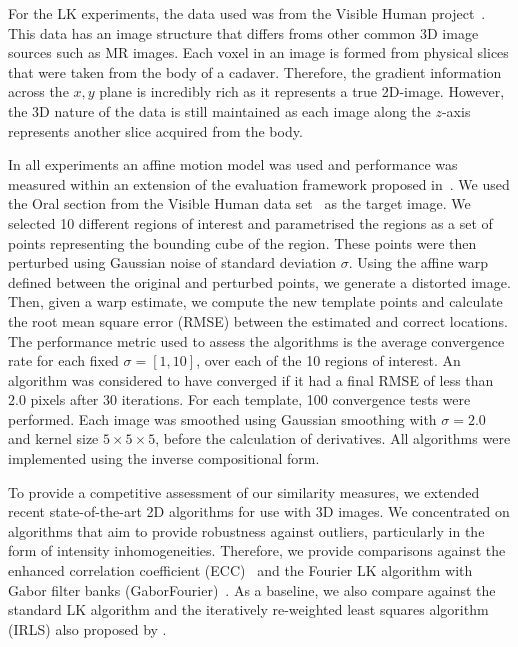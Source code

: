 For the LK experiments, the data used was from the Visible Human
project~\cite{spitzer1996visiblehuman}. 
This data has an image structure that differs froms
other common 3D image sources such as MR images. Each voxel in an image is
formed from physical slices that were taken from the body of a cadaver.
Therefore, the gradient information across the $x, y$ plane is incredibly rich
as it represents a true 2D-image. However, the 3D nature of the data is still
maintained as each image along the $z$-axis represents another slice acquired
from the body.

In all experiments an affine motion model was used and performance was measured
within an extension of the evaluation framework proposed 
in~\cite{tzimiropoulos2011robust}.
We used the Oral section from the Visible Human data 
set~\cite{spitzer1996visiblehuman} as
the target image. We selected 10 different regions of interest and parametrised
the regions as a set of points representing the bounding cube of the region.
These points were then perturbed using Gaussian noise of standard deviation
$\sigma$. Using the affine warp defined between the original and perturbed
points, we generate a distorted image. Then, given a warp estimate, we compute
the new template points and calculate the root mean square error (RMSE) between
the estimated and correct locations. The performance metric used to assess the
algorithms is the average convergence rate for each fixed $\sigma = [1, 10]$,
over each of the 10 regions of interest. An algorithm was considered to have
converged if it had a final RMSE of less than $2.0$ pixels after 30 iterations.
For each template, 100 convergence tests were performed. Each image was smoothed
using Gaussian smoothing with $\sigma = 2.0$ and kernel size $5\times5\times5$,
before the calculation of derivatives. All algorithms were implemented using the
inverse compositional form.

To provide a competitive assessment of our similarity measures, we extended
recent state-of-the-art 2D algorithms for use with 3D images. We concentrated on
algorithms that aim to provide robustness against outliers, particularly in the
form of intensity inhomogeneities. Therefore, we provide comparisons against the
enhanced correlation coefficient (ECC)~\cite{evangelidis2008parametric} 
and the Fourier LK
algorithm with Gabor filter banks (GaborFourier)~\cite{lucey2013fourier}. As a
baseline, we also compare against the standard LK algorithm and the iteratively
re-weighted least squares algorithm (IRLS) also proposed by
\citet{baker2005lk20yearsonpart5}.


